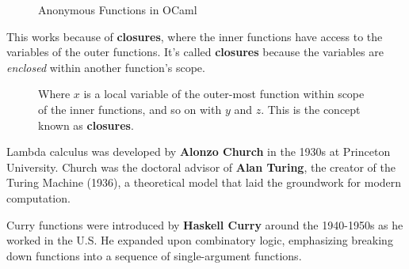\begin{figure}[h]
    {
    \setlength{\fboxsep}{16pt}
    \centering
    }
    \caption{Anonymous Functions in OCaml}
    
    \label{fig:ocaml-anon}
\end{figure}

\vspace{-1em}
\noindent
This works because of \textbf{closures}, where the inner functions have access to the variables of the outer functions.
It's called \textbf{closures} because the variables are \textit{enclosed} within another function's scope.

\begin{figure}[h]
    {
    \setlength{\fboxsep}{0pt}
    \centering
    }
    \caption{Where $x$ is a local variable of the outer-most function within scope of the inner functions, and so on with $y$ and $z$.
    This is the concept known as \textbf{closures}.}
    
    \label{fig:ocaml-anon2}
\end{figure}

\noindent

\vspace{-1em}
\begin{Tip}
    Lambda calculus was developed by \textbf{Alonzo Church} in the 1930s at Princeton University. Church was the doctoral advisor of \textbf{Alan Turing}, the creator of the Turing Machine (1936), a theoretical model that laid the groundwork for modern computation.
    
    Curry functions were introduced by \textbf{Haskell Curry} around the 1940-1950s as he worked in the U.S. He expanded upon combinatory logic, emphasizing breaking down functions into a sequence of single-argument functions.
\end{Tip}
    

